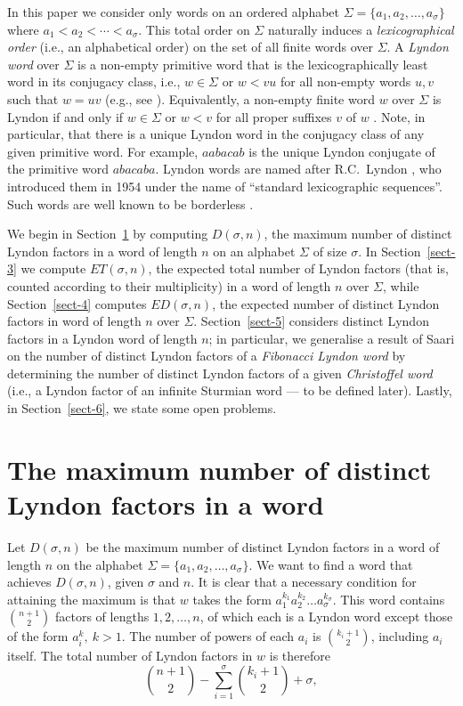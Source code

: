 \documentclass[11pt]{amsart}
\newcommand{\1}{\bar{1}}
\theoremstyle{plain}
\theoremstyle{definition}
\theoremstyle{remark}
\begin{document}
In this paper we consider only words on an ordered alphabet $\Sigma = \{a_1,a_2,\ldots,a_{\sigma}\}$ where $a_1 < a_2 < \cdots < a_{\sigma}$. This total order on $\Sigma$ naturally induces a \textit{lexicographical order} (i.e., an alphabetical order) on the set of all finite words over $\Sigma$. A \textit{Lyndon word} over $\Sigma$ is a non-empty primitive word that is the lexicographically least word in its conjugacy class, i.e., $w \in \Sigma$ or $w < vu$ for all non-empty words $u, v$ such that $w = uv$ (e.g., see \cite{L1}). Equivalently, a non-empty finite word $w$ over $\Sigma$ is Lyndon if and only if $w \in \Sigma$ or $w < v$ for all proper suffixes $v$ of $w$ \cite{D83}. Note, in particular, that there is a unique Lyndon word in the conjugacy class of any given primitive word. For example, $aabacab$ is the unique Lyndon conjugate of the primitive word $abacaba$. Lyndon words are named after R.C.~Lyndon \cite{rL54onbu}, who introduced them in 1954 under the name of ``standard lexicographic sequences''. Such words are well known to be borderless \cite{D83}. 


We begin in Section~\ref{sect-2} by computing $D(\sigma,n)$,
the maximum number of distinct Lyndon factors in a word of length $n$
on an alphabet $\Sigma$ of size $\sigma$. In Section~\ref{sect-3} we compute $ET(\sigma,n)$,
the expected total number of Lyndon factors (that is, counted according to their multiplicity) in a word of length $n$ over $\Sigma$,
while Section~\ref{sect-4} computes $ED(\sigma,n)$,
the expected number of distinct Lyndon factors in word of length $n$ over $\Sigma$. Section~\ref{sect-5} considers distinct Lyndon factors in a Lyndon word of length $n$; in particular, we generalise a result of Saari \cite{kS14lynd} on the number of distinct Lyndon factors of a \textit{Fibonacci Lyndon word} by determining the number of distinct Lyndon factors of a given \textit{Christoffel word} (i.e., a Lyndon factor of an infinite Sturmian word --- to be defined later). Lastly, in Section~\ref{sect-6}, we state some open problems.


\section{The maximum number of distinct Lyndon factors in a word}
\label{sect-2}


Let $D(\sigma,n)$ be the maximum number of distinct Lyndon factors in a word of length $n$ on the alphabet $\Sigma =  \{a_1,a_2,\ldots,a_{\sigma}\}$. 
We want to find a word that achieves $D(\sigma,n)$, given $\sigma$ and $n$.
It is clear that a necessary condition for attaining the maximum is that $w$
takes the form $a_1^{k_1}a_2^{k_2} \dots a_{\sigma}^{k_{\sigma}}$. 
This word contains ${n+1} \choose 2$ factors of lengths $1,2,\ldots,n$,
of which each is a Lyndon word except those of the form $a_i^k,\ k > 1$.
The number of powers of each $a_i$ is ${k_i + 1} \choose 2$, including $a_i$ itself. 
The total number of Lyndon factors in $w$ is therefore
\begin{equation}\label{e1}
{n+1 \choose 2} - \sum_{i=1}^{\sigma} {k_i + 1 \choose 2} + \sigma,
\end{equation}
\end{document}
